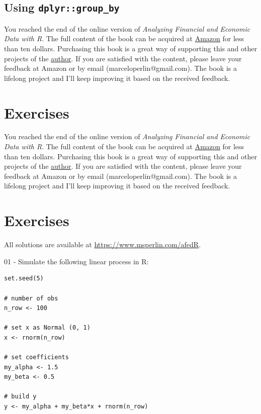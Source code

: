\documentclass[
  12pt,
]{book}
\newenvironment{pleasebuyit}
{\begin{noteblock}
		
	} {\end{noteblock}}
\begin{document}
\hypertarget{using-dplyrgroup_by}{%
\subsection{\texorpdfstring{Using \texttt{dplyr::group\_by}}{Using dplyr::group\_by}}\label{using-dplyrgroup_by}}

\begin{pleasebuyit}
You reached the end of the online version of \emph{Analyzing Financial
and Economic Data with R}. The full content of the book can be acquired
at \href{https://www.amazon.com/dp/B084LSNXMN}{Amazon} for less than ten
dollars. Purchasing this book is a great way of supporting this and
other projects of the \href{https://www.msperlin.com/}{author}. If you
are satisfied with the content, please leave your feedback at Amazon or
by email (marceloperlin@gmail.com). The book is a lifelong project and
I'll keep improving it based on the received feedback.
\end{pleasebuyit}

\hypertarget{exercises-11}{%
\section{Exercises}\label{exercises-11}}

\begin{pleasebuyit}
You reached the end of the online version of \emph{Analyzing Financial
and Economic Data with R}. The full content of the book can be acquired
at \href{https://www.amazon.com/dp/B084LSNXMN}{Amazon} for less than ten
dollars. Purchasing this book is a great way of supporting this and
other projects of the \href{https://www.msperlin.com/}{author}. If you
are satisfied with the content, please leave your feedback at Amazon or
by email (marceloperlin@gmail.com). The book is a lifelong project and
I'll keep improving it based on the received feedback.
\end{pleasebuyit}

\hypertarget{exercises-12}{%
\section{Exercises}\label{exercises-12}}

All solutions are available at \url{https://www.msperlin.com/afedR}.

01 -
Simulate the following linear process in R:

\begin{verbatim}
set.seed(5)

# number of obs
n_row <- 100

# set x as Normal (0, 1)
x <- rnorm(n_row)

# set coefficients
my_alpha <- 1.5
my_beta <- 0.5

# build y
y <- my_alpha + my_beta*x + rnorm(n_row)
\end{verbatim}
\end{document}
